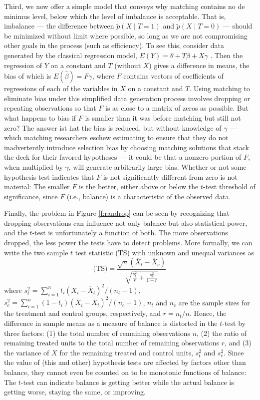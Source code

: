 \documentclass[11pt,titlepage]{article}
\begin{document}
Third, we now offer a simple model that conveys why matching contains
no de minimus level, below which the level of imbalance is acceptable.
That is, imbalance --- the difference between $\tilde p(X\mid T=1)$
and $\tilde p(X\mid T=0)$ --- should be minimized without limit where
possible, so long as we are not compromising other goals in the
process (such as efficiency).  To see this, consider data generated by
the classical regression model, $E(Y)= \theta + T\beta + X\gamma$
\citep{Goldberger91}.  Then the regression of $Y$ on a constant and
$T$ (without $X$) gives a difference in means, the bias of which is
$E(\hat\beta) = F\gamma$, where $F$ contains vectors of coefficients
of regressions of each of the variables in $X$ on a constant and $T$.
Using matching to eliminate bias under this simplified data generation
process involves dropping or repeating observations so that $F$ is as
close to a matrix of zeros as possible.  But what happens to bias if
$F$ is smaller than it was before matching but still not zero?  The
answer ist hat the bias is reduced, but without knowledge of $\gamma$
--- which matching researchers eschew estimating to ensure that they
do not inadvertently introduce selection bias by choosing matching
solutions that stack the deck for their favored hypotheses --- it
could be that a nonzero portion of $F$, when multiplied by $\gamma$,
will generate arbitrarily large bias.  Whether or not some hypothesis
test indicates that $F$ is not significantly different from zero is
not material: The smaller $F$ is the better, either above or below the
$t$-test threshold of significance, since $F$ (i.e., balance) is a
characteristic of the observed data.

Finally, the problem in Figure \ref{f:randrop} can be seen by
recognizing that dropping observations can influence not only balance
but also statistical power, and the $t$-test is unfortunately a
function of both.  The more observations dropped, the less power the
tests have to detect problems.  More formally, we can write the two
sample $t$ test statistic (TS) with unknown and unequal variances as
\begin{equation}
  \label{ttest}
\text{(TS)} = \frac{\sqrt{n}(\overline{X}_t-\overline{X}_c)}
               {\sqrt{\frac{s^2_t}{r} + \frac{s^2_c}{1-r}}}
\end{equation}
where $s^2_t=\sum_{i=1}^n t_i(X_i - \overline{X}_t)^2/(n_t-1)$,
$s^2_c=\sum_{i=1}^n (1-t_i)(X_i - \overline{X}_t)^2/(n_c-1)$, $n_t$
and $n_c$ are the sample sizes for the treatment and control groups,
respectively, and $r=n_t/n$.  Hence, the difference in sample means as
a measure of balance is distorted in the $t$-test by three factors:
(1) the total number of remaining observations $n$, (2) the ratio of
remaining treated units to the total number of remaining observations
$r$, and (3) the variance of $X$ for the remaining treated and control
units, $s_t^2$ and $s_c^2$.  Since the value of (this and other)
hypothesis tests are affected by factors other than balance, they
cannot even be counted on to be monotonic functions of balance: The
$t$-test can indicate balance is getting better while the actual
balance is getting worse, staying the same, or improving.
\end{document}
